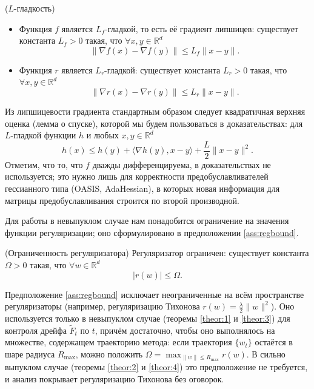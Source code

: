 \begin{assumption}{($L$-гладкость)}
\label{ass:smoothness}
\begin{itemize}
    \item 	Функция $f$ является $L_f$-гладкой, то есть её градиент липшицев: существует константа $L_f > 0$ такая, что $\forall x, y \in \mathbb{R}^d$
    	\begin{equation*}
    		\|\nabla f(x) - \nabla f(y)\| \leq L_f \|x - y\|.
    	\end{equation*}
    \item    Функция $r$ является $L_r$-гладкой: существует константа $L_r > 0$ такая, что $\forall x, y \in \mathbb{R}^d$
	\begin{equation*}
		\|\nabla r(x) - \nabla r(y)\| \leq L_r \|x - y\|.
	\end{equation*}
\end{itemize}
\end{assumption}

Из липшицевости градиента стандартным образом следует квадратичная верхняя оценка (лемма о спуске), которой мы будем пользоваться в доказательствах: для $L$-гладкой функции $h$ и любых $x, y \in \mathbb{R}^d$
\begin{equation}
\label{eq:descent_lemma}
    h(x) \leq h(y) + \langle \nabla h(y), x-y \rangle + \frac{L}{2} \|x - y\|^2.
\end{equation}
Отметим, что то, что $f$ дважды дифференцируема, в доказательствах не используется; это нужно лишь для корректности предобуславливателей гессианного типа (OASIS, AdaHessian), в которых новая информация для матрицы предобуславливания строится по второй производной.

Для работы в невыпуклом случае нам понадобится ограничение на значения функции регуляризации; оно сформулировано в предположении \ref{ass:regbound}.

\begin{assumption}{(Ограниченность регуляризатора)}
\label{ass:regbound}
Регуляризатор ограничен: существует константа $\Omega > 0$ такая, что $\forall w \in \mathbb{R}^d$
\begin{equation*}
|r(w)| \le \Omega.
\end{equation*}
\end{assumption}

\begin{note}
Предположение \ref{ass:regbound} исключает неограниченные на всём пространстве регуляризаторы (например, регуляризацию Тихонова $r(w) = \frac{\lambda}{2}\|w\|^2$). Оно используется только в невыпуклом случае (теоремы \ref{theor:1} и \ref{theor:3}) для контроля дрейфа $\widetilde{F}_t$ по $t$, причём достаточно, чтобы оно выполнялось на множестве, содержащем траекторию метода: если траектория $\{w_t\}$ остаётся в шаре радиуса $R_{\max}$, можно положить $\Omega = \max_{\|w\| \le R_{\max}} r(w)$. В сильно выпуклом случае (теоремы \ref{theor:2} и \ref{theor:4}) это предположение не требуется, и анализ покрывает регуляризацию Тихонова без оговорок.
\end{note}

